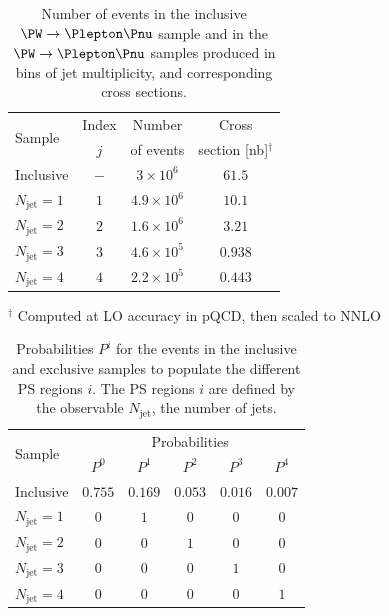 \documentclass[twocolumn,epjc3]{svjour3}
\newcommand{\jet}{\ensuremath{\textrm{jet}}\xspace}
\begin{document}
\begin{table}
\caption{
  Number of events in the inclusive $\PW \to \Plepton\Pnu$ sample and in the $\PW \to \Plepton\Pnu$ samples produced in bins of jet multiplicity,
  and corresponding cross sections.
}
\label{tab:samples_WJets_vs_Njet}
\begin{center}
\begin{tabular}{l|c|c|c}
\hline
\multirow{2}{12mm}{Sample} & Index & Number    & Cross                    \\
                           & $j$   & of events & section [nb]$^{\dagger}$ \\
\hline
Inclusive                  & $-$   & $3 \times 10^{6}$ & $61.5$           \\
\hline
$N_{\jet} = 1$             & $1$   & $4.9 \times 10^{6}$ & $10.1$           \\
$N_{\jet} = 2$             & $2$   & $1.6 \times 10^{6}$ & $3.21$           \\
$N_{\jet} = 3$             & $3$   & $4.6 \times 10^{5}$ & $0.938$          \\
$N_{\jet} = 4$             & $4$   & $2.2 \times 10^{5}$ & $0.443$          \\
\hline
\end{tabular}
\end{center}
$^{\dagger}$ Computed at LO accuracy in pQCD, then scaled to NNLO
\end{table}

\begin{table}
\caption{
  Probabilities $P^{i}$ for the events in the inclusive and exclusive samples to populate the different PS regions $i$.
  The PS regions $i$ are defined by the observable $N_{\jet}$, the number of jets.
}
\label{tab:probabilities_WJets_vs_Njet}
\begin{center}
\begin{tabular}{l|ccccc}
\hline
\multirow{2}{12mm}{Sample} & \multicolumn{5}{c}{Probabilities}               \\
                           & $P^{0}$ & $P^{1}$ & $P^{2}$ & $P^{3}$ & $P^{4}$ \\
\hline
Inclusive                  & $0.755$ & $0.169$ & $0.053$ & $0.016$ & $0.007$ \\
\hline
$N_{\jet} = 1$             & $0$     & $1$     & $0$     & $0$     & $0$     \\
$N_{\jet} = 2$             & $0$     & $0$     & $1$     & $0$     & $0$     \\
$N_{\jet} = 3$             & $0$     & $0$     & $0$     & $1$     & $0$     \\
$N_{\jet} = 4$             & $0$     & $0$     & $0$     & $0$     & $1$     \\
\hline
\end{tabular}
\end{center}
\end{table}
\end{document}

